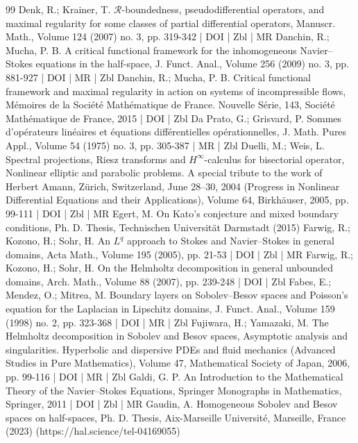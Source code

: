 \documentclass[10pt]{amsart}
\theoremstyle{definition}\newtheorem{defi}[theo]{Definition}\newtheorem{rema}[theo]{Remark}\newtheorem{exam}[theo]{Example}\newtheorem{exem}[theo]{Example}\newtheorem{nota}[theo]{Notation}
\begin{document}
\begin{thebibliography}{99}
 Denk, R.; Krainer, T. $\mathcal{R}$-boundedness, pseudodifferential operators, and maximal regularity for some classes of partial differential operators, Manuscr. Math., Volume 124 (2007) no. 3, pp. 319-342 | DOI | Zbl | MR
 Danchin, R.; Mucha, P. B. A critical functional framework for the inhomogeneous Navier–Stokes equations in the half-space, J. Funct. Anal., Volume 256 (2009) no. 3, pp. 881-927 | DOI | MR | Zbl
 Danchin, R.; Mucha, P. B. Critical functional framework and maximal regularity in action on systems of incompressible flows, Mémoires de la Société Mathématique de France. Nouvelle Série, 143, Société Mathématique de France, 2015 | DOI | Zbl
 Da Prato, G.; Grisvard, P. Sommes d’opérateurs linéaires et équations différentielles opérationnelles, J. Math. Pures Appl., Volume 54 (1975) no. 3, pp. 305-387 | MR | Zbl
 Duelli, M.; Weis, L. Spectral projections, Riesz transforms and ${H}^{\infty }$-calculus for bisectorial operator, Nonlinear elliptic and parabolic problems. A special tribute to the work of Herbert Amann, Zürich, Switzerland, June 28–30, 2004 (Progress in Nonlinear Differential Equations and their Applications), Volume 64, Birkhäuser, 2005, pp. 99-111 | DOI | Zbl | MR
 Egert, M. On Kato’s conjecture and mixed boundary conditions, Ph. D. Thesis, Technischen Universität Darmstadt (2015)
 Farwig, R.; Kozono, H.; Sohr, H. An ${L}^q$ approach to Stokes and Navier–Stokes in general domains, Acta Math., Volume 195 (2005), pp. 21-53 | DOI | Zbl | MR
 Farwig, R.; Kozono, H.; Sohr, H. On the Helmholtz decomposition in general unbounded domains, Arch. Math., Volume 88 (2007), pp. 239-248 | DOI | Zbl
 Fabes, E.; Mendez, O.; Mitrea, M. Boundary layers on Sobolev–Besov spaces and Poisson’s equation for the Laplacian in Lipschitz domains, J. Funct. Anal., Volume 159 (1998) no. 2, pp. 323-368 | DOI | MR | Zbl
 Fujiwara, H.; Yamazaki, M. The Helmholtz decomposition in Sobolev and Besov spaces, Asymptotic analysis and singularities. Hyperbolic and dispersive PDEs and fluid mechanics (Advanced Studies in Pure Mathematics), Volume 47, Mathematical Society of Japan, 2006, pp. 99-116 | DOI | MR | Zbl
 Galdi, G. P. An Introduction to the Mathematical Theory of the Navier–Stokes Equations, Springer Monographs in Mathematics, Springer, 2011 | DOI | Zbl | MR
 Gaudin, A. Homogeneous Sobolev and Besov spaces on half-spaces, Ph. D. Thesis, Aix-Marseille Université, Marseille, France (2023) (https://hal.science/tel-04169055)

\end{thebibliography}
\end{document}
